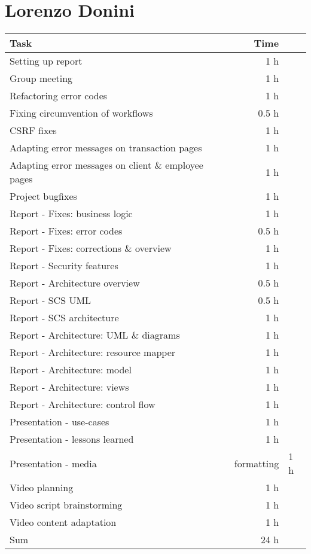 \section*{Lorenzo Donini}
\begin{table}[h!tpb]
  \centering
  \begin{tabularx}{\textwidth}{X r}
    \toprule
      Task & Time \\
    \midrule
      Setting up report & 1 h \\      
      Group meeting & 1 h \\
      Refactoring error codes & 1 h \\
      Fixing circumvention of workflows & 0.5 h \\
      CSRF fixes & 1 h \\
      Adapting error messages on transaction pages & 1 h \\
      Adapting error messages on client \& employee pages & 1 h \\
      Project bugfixes & 1 h \\
      Report - Fixes: business logic & 1 h \\
      Report - Fixes: error codes & 0.5 h \\
      Report - Fixes: corrections \& overview & 1 h \\
      Report - Security features & 1 h \\
      Report - Architecture overview & 0.5 h \\
      Report - SCS UML & 0.5 h \\
      Report - SCS architecture & 1 h \\
      Report - Architecture: UML \& diagrams & 1 h \\
      Report - Architecture: resource mapper & 1 h \\
      Report - Architecture: model & 1 h \\
      Report - Architecture: views & 1 h \\
      Report - Architecture: control flow & 1 h \\
      Presentation - use-cases & 1 h \\
      Presentation - lessons learned & 1 h \\
      Presentation - media & formatting & 1 h \\
      Video planning & 1 h \\
      Video script brainstorming & 1 h \\
      Video content adaptation & 1 h \\
    \midrule
      Sum & 24 h \\
    \bottomrule
  \end{tabularx}
\end{table}

